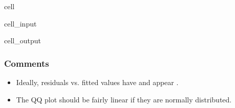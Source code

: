 \documentclass[letterpaper,10pt,english]{jupyterBook}
\begin{document}
\begin{sphinxuseclass}{cell}\begin{sphinxVerbatimInput}

\begin{sphinxuseclass}{cell_input}
\begin{sphinxVerbatim}[commandchars=\\\{\}]
 
  
\end{sphinxVerbatim}

\end{sphinxuseclass}\end{sphinxVerbatimInput}
\begin{sphinxVerbatimOutput}

\begin{sphinxuseclass}{cell_output}
\noindent{}

\end{sphinxuseclass}\end{sphinxVerbatimOutput}

\end{sphinxuseclass}

\subsubsection{Comments}
\label{\detokenize{02:comments}}\begin{itemize}
\item {} 
\sphinxAtStartPar
Ideally, residuals vs. fitted values have  and appear .

\item {} 
\sphinxAtStartPar
The Q\sphinxhyphen{}Q plot should be fairly linear if they are normally distributed.

\end{itemize}
\end{document}
